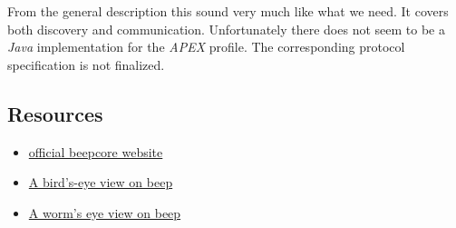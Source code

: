 From the general description this sound very much like what we need. It covers both discovery and communication. Unfortunately there does not seem to be a \emph{Java} implementation for the \emph{APEX} profile. The corresponding protocol specification is not finalized.



\subsection{Resources}
\begin{itemize}
 \item \href{http://www.beepcore.org/}{official beepcore website}
 \item \href{http://www-106.ibm.com/developerworks/xml/library/x-beep/index.html}{A bird's-eye view on beep}
 \item \href{http://www-128.ibm.com/developerworks/xml/library/x-beep2.html}{A worm's eye view on beep}
\end{itemize}
